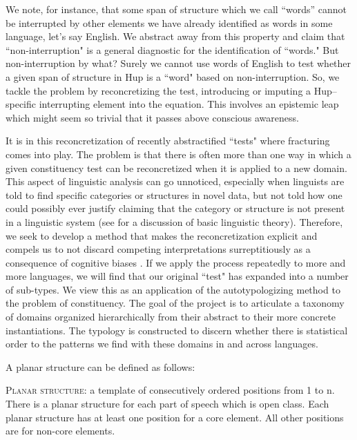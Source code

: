 \documentclass[output=paper,draftmode]{langscibook}
\begin{document}
We note, for instance, that some span of structure which we call ``words'' cannot be interrupted by other elements we have already identified as words in some language, let's say English. We abstract away from this property and claim that ``non-interruption" is a general diagnostic for the identification of ``words." But non-interruption by what? Surely we cannot use words of English to test whether a given span of structure in Hup is a ``word" based on non-interruption. So, we tackle the problem by reconcretizing the test, introducing or imputing a Hup--specific interrupting element into the equation. This involves an epistemic leap which might seem so trivial that it passes above conscious awareness. 

It is in this reconcretization of recently abstractified ``tests" where fracturing comes into play. The problem is that there is often more than one way in which a given constituency test can be reconcretized when it is applied to a new domain.
This aspect of linguistic analysis can go unnoticed, especially when linguists are told to find specific categories or structures in novel data, but not told how one could possibly ever justify claiming that the category or structure is not present in a linguistic system (see  for a discussion of basic linguistic theory). Therefore, we seek to develop a method that makes the reconcretization explicit and compels us to not discard competing interpretations surreptitiously as a consequence of cognitive biases \citep{ackermann1985data}.
If we apply the process repeatedly to more and more languages, we will find that our original ``test" has expanded into a number of sub-types. We view this as an application of the autotypologizing method \citep{bickel2002autotypologizing, witzlack2022managing} to the problem of constituency. 
The goal of the project is to articulate a taxonomy of domains organized hierarchically from their abstract to their more concrete instantiations. The typology is constructed to discern whether there is statistical order to the patterns we find with these domains in and across languages.

A planar structure can be defined as follows:

\ea 
    \textsc{Planar structure}: a template of consecutively ordered positions from 1 to n. There is a planar structure for each part of speech which is open class. Each planar structure has at least one position for a core element. All other positions are for non-core elements.
\z 
\end{document}
